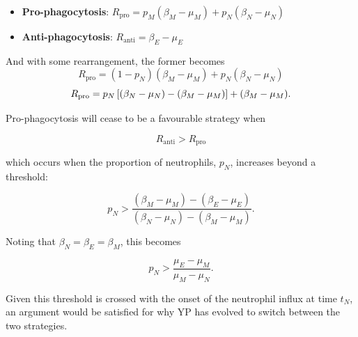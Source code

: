 \begin{itemize}
\item \textbf{Pro-phagocytosis}: $R_{\text{pro}} = p_M(\beta_M -  \mu_M) + p_N (\beta_N - \mu_N)$
\item \textbf{Anti-phagocytosis}: $ R_{\text{anti}}  = \beta_E -  \mu_E $ 
\end{itemize}
And with some rearrangement, the former becomes
$$ R_{\text{pro}} =(1-p_N)(\beta_M -  \mu_M) + p_N (\beta_N - \mu_N)$$
$$R_{\text{pro}} =p_N \left[ (\beta_N - \mu_N)  - (\beta_M -  \mu_M)\right]  +     (\beta_M -  \mu_M).$$

\noindent
Pro-phagocytosis will cease to be a favourable strategy when 

$$R_{\text{anti}} > R_{\text{pro}}$$ 

\noindent
which occurs when the proportion of neutrophils, $p_N$, increases beyond a threshold: 

$$p_N > \frac{ (\beta_M -  \mu_M)  -  (\beta_E -  \mu_E) }{   (\beta_N - \mu_N)    -   (\beta_M -  \mu_M) } .$$

\noindent
Noting that $\beta_N = \beta _E = \beta_M$, this becomes

$$p_N > \frac{  \mu_E - \mu_M }{    \mu_M - \mu_N} .$$

\noindent
Given this threshold is crossed with the onset of the neutrophil influx at time $t_N$, an argument would be satisfied for why YP has evolved to switch between the two strategies.
